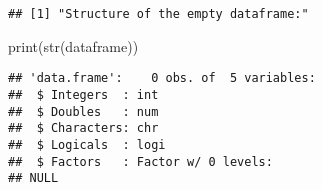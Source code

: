 \documentclass[
]{article}
\newenvironment{Shaded}{\begin{snugshade}}{\end{snugshade}}
\newcommand{\FunctionTok}[1]{\textcolor[rgb]{0.00,0.00,0.00}{#1}}
\newcommand{\NormalTok}[1]{#1}
\begin{document}
\begin{verbatim}
## [1] "Structure of the empty dataframe:"
\end{verbatim}

\begin{Shaded}
\begin{Highlighting}[]
          \FunctionTok{print}\NormalTok{(}\FunctionTok{str}\NormalTok{(dataframe))}
\end{Highlighting}
\end{Shaded}

\begin{verbatim}
## 'data.frame':    0 obs. of  5 variables:
##  $ Integers  : int 
##  $ Doubles   : num 
##  $ Characters: chr 
##  $ Logicals  : logi 
##  $ Factors   : Factor w/ 0 levels: 
## NULL
\end{verbatim}
\end{document}
